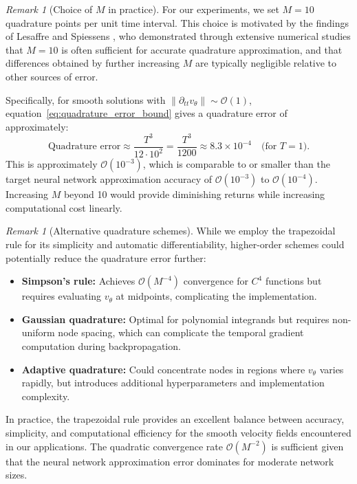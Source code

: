 \documentclass[11pt,reqno]{amsart}
\theoremstyle{plain}
\theoremstyle{definition}
\theoremstyle{remark}
\newtheorem{remark}[theorem]{Remark}
\begin{document}
\begin{remark}[Choice of $M$ in practice]\label{rem:choice_of_M}
For our experiments, we set $M = 10$ quadrature points per unit time interval. This choice is motivated by the findings of Lesaffre and Spiessens \cite{lesaffre2001number}, who demonstrated through extensive numerical studies that $M = 10$ is often sufficient for accurate quadrature approximation, and that differences obtained by further increasing $M$ are typically negligible relative to other sources of error. 

\noindent Specifically, for smooth solutions with $\|\partial_{tt} v_\theta\| \sim \mathcal{O}(1)$, equation~\eqref{eq:quadrature_error_bound} gives a quadrature error of approximately:
\begin{equation}
\text{Quadrature error} \approx \frac{T^3}{12 \cdot 10^2} = \frac{T^3}{1200} \approx 8.3 \times 10^{-4} \quad \text{(for } T=1\text{)}.
\end{equation}
This is approximately $\mathcal{O}(10^{-3})$, which is comparable to or smaller than the target neural network approximation accuracy of $\mathcal{O}(10^{-3})$ to $\mathcal{O}(10^{-4})$. Increasing $M$ beyond 10 would provide diminishing returns while increasing computational cost linearly.
\end{remark}

\begin{remark}[Alternative quadrature schemes]
While we employ the trapezoidal rule for its simplicity and automatic differentiability, higher-order schemes could potentially reduce the quadrature error further:

\begin{itemize}
    \item \textbf{Simpson's rule:} Achieves $\mathcal{O}(M^{-4})$ convergence for $C^4$ functions but requires evaluating $v_\theta$ at midpoints, complicating the implementation.
    
    \item \textbf{Gaussian quadrature:} Optimal for polynomial integrands but requires non-uniform node spacing, which can complicate the temporal gradient computation during backpropagation.
    
    \item \textbf{Adaptive quadrature:} Could concentrate nodes in regions where $v_\theta$ varies rapidly, but introduces additional hyperparameters and implementation complexity.
\end{itemize}
In practice, the trapezoidal rule provides an excellent balance between accuracy, simplicity, and computational efficiency for the smooth velocity fields encountered in our applications. The quadratic convergence rate $\mathcal{O}(M^{-2})$ is sufficient given that the neural network approximation error dominates for moderate network sizes.
\end{remark}
\end{document}
